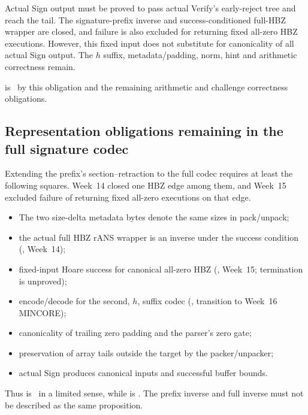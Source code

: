 \begin{openobligation}
Actual Sign output must be proved to pass actual Verify's early-reject tree and
reach the tail. The signature-prefix inverse and success-conditioned full-HBZ
wrapper are closed, and failure is also excluded for returning fixed all-zero
HBZ executions. However, this fixed input does not substitute for canonicality
of all actual Sign output. The \(h\) suffix, metadata/padding, norm, hint and
arithmetic correctness remain.
\end{openobligation}

 is \statusblocked\ by this obligation and
the remaining arithmetic and challenge correctness obligations.

\subsection{Representation obligations remaining in the full signature codec}

Extending the prefix's section--retraction to the full codec requires at least
the following squares. Week~14 closed one HBZ edge among them, and Week~15
excluded failure of returning fixed all-zero executions on that edge.

\begin{itemize}
  \item The two size-delta metadata bytes denote the same sizes in pack/unpack;
  \item the actual full HBZ rANS wrapper is an inverse under the success condition
        (\statusproved, Week~14);
  \item fixed-input Hoare success for canonical all-zero HBZ
        (\statusproved, Week~15; termination is unproved);
  \item encode/decode for the second, \(h\), suffix codec
        (\statusdeferred, transition to Week~16 MINCORE);
  \item canonicality of trailing zero padding and the parser's zero gate;
  \item preservation of array tails outside the target by the packer/unpacker;
  \item actual Sign produces canonical inputs and successful buffer bounds.
\end{itemize}

Thus  is \statusproved\ in a limited sense, while
 is \statusblocked. The prefix inverse and full
inverse must not be described as the same proposition.

